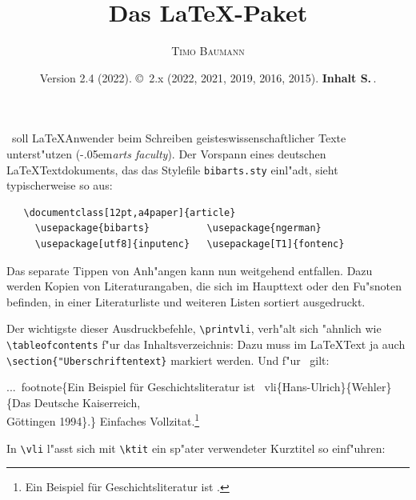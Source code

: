 \documentclass[12pt,a4paper]{article}
\title{Das \LaTeX-Paket \BibArts}
\author{\scshape{Timo Baumann}}
\date{\small Version 2.4 (2022). \hspace{.5em}\copyright\ 2.x (2022, 2021, 2019, 2016, 2015).
         \hspace{.5em}\textbf{Inhalt S.\,\pageref{SectIn}}.}
\newcommand{\pbs}{\string\ \unskip}
\newcommand{\bs}{\protect\pbs}
\begin{document}
 \maketitle 

 \noindent
 \BibArts\ soll \LaTeX\hy Anwender beim Schreiben geisteswissenschaftlicher
 Texte unterst"utzen (\kern-.05em\textit{arts faculty}). Der Vorspann eines deutschen 
 \LaTeX\hy Textdokuments, das das Stylefile \verb|bibarts.sty| einl"adt, 
 sieht typischerweise so aus:

  \vspace{-1.5ex}
        {\small\begin{verbatim}
   \documentclass[12pt,a4paper]{article} 
     \usepackage{bibarts}          \usepackage{ngerman}
     \usepackage[utf8]{inputenc}   \usepackage[T1]{fontenc}
  \end{verbatim}}
 
 \vspace{-4ex}\noindent
 Das separate Tippen von Anh"angen kann nun weitgehend entfallen. Dazu
 werden Kopien von Literaturangaben, die sich im Haupttext oder den
 Fu"snoten befinden, in einer Literaturliste und weiteren Listen sortiert
 ausgedruckt.
 
 \vspace{1ex}\noindent 
 Der wichtigste dieser Ausdruckbefehle, \verb|\printvli|\hspace{.01em},
 verh"alt sich "ahnlich wie \verb|\tableofcontents| \hspace{.025em}f"ur das
 Inhaltsverzeichnis: Dazu muss im \LaTeX\hy Text ja auch
 \hspace{.025em}\verb|\section{|\texttt{"Uberschriftentext}\verb|}|
 \hspace{.05em}markiert werden. \hspace{.025em}Und f"ur \BibArts\ gilt:
 
 \Doppelbox
 {...\bs footnote\{Ein Beispiel für Geschichtsliteratur ist
  \bs vli\{Hans-Ulrich\}\{Wehler\}\{Das Deutsche Kaiserreich, 
  \\ Göttingen 1994\}.\}
 }
 {Einfaches Vollzitat.\footnote{Ein Beispiel für Geschichtsliteratur ist
  .}
 }

\noindent
In \verb|\vli| l"asst sich mit \verb|\ktit| ein sp"ater 
verwendeter Kurztitel so einf"uhren:
\end{document}
